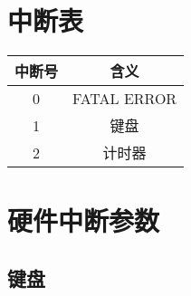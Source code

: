\section{中断表}
\begin{tabular}{|c|c|}
    \hline
    中断号 & 含义\\\hline
    0     & FATAL ERROR\\\hline
    1     & 键盘\\\hline
    2     & 计时器\\\hline
\end{tabular}

\section{硬件中断参数}
\subsection{键盘}

